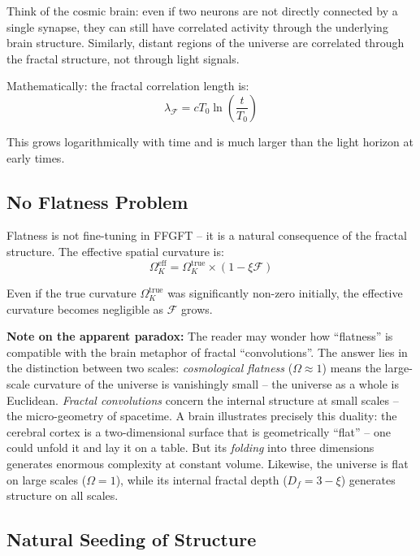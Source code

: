Think of the cosmic brain: even if two neurons are not directly connected by a single synapse, they can still have correlated activity through the underlying brain structure. Similarly, distant regions of the universe are correlated through the fractal structure, not through light signals.

Mathematically: the fractal correlation length is:
\begin{equation}
\lambda_{\mathcal{F}} = c T_0 \ln\left(\frac{t}{T_0}\right)
\end{equation}

This grows logarithmically with time and is much larger than the light horizon at early times.

\subsection{No Flatness Problem}

Flatness is not fine-tuning in FFGFT -- it is a natural consequence of the fractal structure. The effective spatial curvature is:
\begin{equation}
\Omega_K^{\text{eff}} = \Omega_K^{\text{true}} \times (1 - \xi \mathcal{F})
\end{equation}

Even if the true curvature $\Omega_K^{\text{true}}$ was significantly non-zero initially, the effective curvature becomes negligible as $\mathcal{F}$ grows.

\textbf{Note on the apparent paradox:} The reader may wonder how ``flatness'' is compatible with the brain metaphor of fractal ``convolutions''. The answer lies in the distinction between two scales: \textit{cosmological flatness} ($\Omega \approx 1$) means the large-scale curvature of the universe is vanishingly small -- the universe as a whole is Euclidean. \textit{Fractal convolutions} concern the internal structure at small scales -- the micro-geometry of spacetime. A brain illustrates precisely this duality: the cerebral cortex is a two-dimensional surface that is geometrically ``flat'' -- one could unfold it and lay it on a table. But its \textit{folding} into three dimensions generates enormous complexity at constant volume. Likewise, the universe is flat on large scales ($\Omega = 1$), while its internal fractal depth ($D_f = 3 - \xi$) generates structure on all scales.

\subsection{Natural Seeding of Structure}

